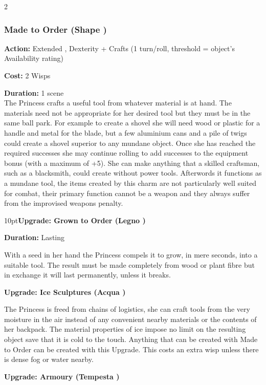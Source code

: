 \begin{multicols}{2}
\subsubsection*{Made to Order (Shape \textbullet\textbullet\textbullet)}
\noindent \textbf{Action:} Extended , Dexterity + Crafts (1 turn/roll, threshold = object's Availability rating)

\noindent \textbf{Cost:} 2 Wisps

\noindent \textbf{Duration:} 1 scene\\

\noindent The Princess crafts a useful tool from whatever material is at hand. The materials need not be appropriate for her desired tool but they must be in the same ball park. For example to create a shovel she will need wood or plastic for a handle and metal for the blade, but a few aluminium cans and a pile of twigs could create a shovel superior to any mundane object. Once she has reached the required successes she may continue rolling to add successes to the equipment bonus (with a maximum of +5). She can make anything that a skilled craftsman, such as a blacksmith, could create without power tools. Afterwords it functions as a mundane tool, the items created by this charm are not particularly well suited for combat, their primary function cannot be a weapon and they always suffer from the improvised weapons penalty.

\begin{myindentpar}{10pt}\textbf{Upgrade: Grown to Order (Legno \textbullet\textbullet)}

\noindent \textbf{Duration:} Lasting

With a seed in her hand the Princess compels it to grow, in mere seconds, into a suitable tool. The result must be made completely from wood or plant fibre but in exchange it will last permanently, unless it breaks.

\textbf{Upgrade: Ice Sculptures (Acqua \textbullet\textbullet)}

The Princess is freed from chains of logistics, she can craft tools from the very moisture in the air instead of any convenient nearby materials or the contents of her backpack. The material properties of ice impose no limit on the resulting object save that it is cold to the touch. Anything that can be created with Made to Order can be created with this Upgrade. This costs an extra wisp unless there is dense fog or water nearby.

\textbf{Upgrade: Armoury (Tempesta \textbullet\textbullet)}


\end{myindentpar}
\end{multicols}
